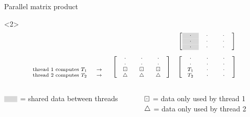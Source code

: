 \documentclass[12pt,aspectratio=1610]{beamer}
\begin{document}
\begin{frame}{Parallel matrix product}
\begin{onlyenv}
\begin{onlyenv}<2>
\[
\scriptsize
\begin{array}{ccc}
&& \left[\begin{array}{ccc}
\ \ \cl{\cdot} \ \ & \ \ \cdot \ \  & \ \ \cdot \ \ \\
\ \ \cl{\cdot} \ \ & \ \ \cdot \ \  & \ \ \cdot \ \ \\
\ \ \cl{\cdot} \ \ & \ \ \cdot \ \  & \ \ \cdot \ \ \\
\end{array}\right]\\
\\
\begin{array}{r}
\\
\\
\text{thread 1 computes }T_1 \ \ \ \ \rw\\
\text{thread 2 computes }T_2 \ \ \ \ \rw\\
\end{array}
& \left[\begin{array}{ccc}
\ \ \cdot \ \ & \ \ \cdot \ \  & \ \ \cdot \ \ \\
\ \ \cdot \ \ & \ \ \cdot \ \  & \ \ \cdot \ \ \\
\bd & \bd & \bd \\
\uptri & \uptri & \uptri \\
\end{array}\right]
& \left[\begin{array}{ccc}
\ \ \cdot \ \ & \ \ \cdot \ \  & \ \ \cdot \ \ \\
\ \ \cdot \ \ & \ \ \cdot \ \  & \ \ \cdot \ \ \\
\ T_1 \ & \ \ \cdot \ \  & \ \ \cdot \ \ \\
\ T_2 \ & \ \ \cdot \ \  & \ \ \cdot \ \ \\
\end{array}\right]
\end{array}
\]
\end{onlyenv}

\vspace{0.3cm}

\begin{columns}
\begin{column}{0.5\textwidth}
\footnotesize
$\scriptsize\begin{array}{c}\cl{\ \ \ }\end{array}$ = shared data between threads
\end{column}
\begin{column}{0.5\textwidth}
\footnotesize
$\boxdot$ = data only used by thread 1\\
$\bigtriangleup$ = data only used by thread 2
\end{column}
\end{columns}
\end{onlyenv}


\end{frame}
\end{document}
